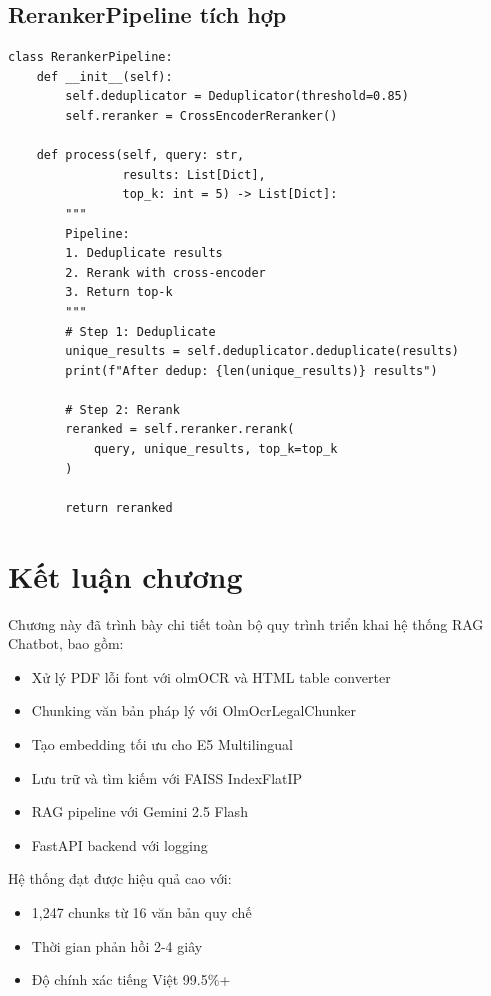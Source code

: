 \documentclass[../DoAn.tex]{subfiles}
\begin{document}
\subsection{RerankerPipeline tích hợp}
\begin{verbatim}
class RerankerPipeline:
    def __init__(self):
        self.deduplicator = Deduplicator(threshold=0.85)
        self.reranker = CrossEncoderReranker()
    
    def process(self, query: str, 
                results: List[Dict], 
                top_k: int = 5) -> List[Dict]:
        """
        Pipeline:
        1. Deduplicate results
        2. Rerank with cross-encoder
        3. Return top-k
        """
        # Step 1: Deduplicate
        unique_results = self.deduplicator.deduplicate(results)
        print(f"After dedup: {len(unique_results)} results")
        
        # Step 2: Rerank
        reranked = self.reranker.rerank(
            query, unique_results, top_k=top_k
        )
        
        return reranked
\end{verbatim}

\section{Kết luận chương}

Chương này đã trình bày chi tiết toàn bộ quy trình triển khai hệ thống RAG Chatbot, bao gồm:

\begin{itemize}
    \item Xử lý PDF lỗi font với olmOCR và HTML table converter
    \item Chunking văn bản pháp lý với OlmOcrLegalChunker
    \item Tạo embedding tối ưu cho E5 Multilingual
    \item Lưu trữ và tìm kiếm với FAISS IndexFlatIP
    \item RAG pipeline với Gemini 2.5 Flash
    \item FastAPI backend với logging
\end{itemize}

Hệ thống đạt được hiệu quả cao với:
\begin{itemize}
    \item 1,247 chunks từ 16 văn bản quy chế
    \item Thời gian phản hồi 2-4 giây
    \item Độ chính xác tiếng Việt 99.5\%+
\end{itemize}
\end{document}
